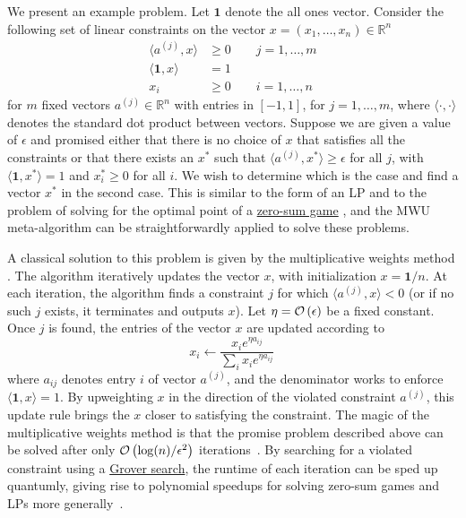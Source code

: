 \begin{refsection}
We present an example problem. Let $\mathbf{1}$ denote the all ones vector. Consider the following set of linear constraints on the vector $x = (x_1,\ldots,x_n) \in \mathbb{R}^n$
\begin{align}
    \langle a^{(j)},x \rangle &\geq 0 \qquad j = 1,\ldots,m\\
    \langle \mathbf{1},x \rangle &= 1 \\
    x_i &\geq 0 \qquad i=1,\ldots,n
\end{align}
for $m$ fixed vectors $a^{(j)} \in \mathbb{R}^n$ with entries in $[-1,1]$, for $j = 1, \ldots, m$, where $\langle \cdot,\cdot \rangle$ denotes the standard dot product between vectors. Suppose we are given a value of $\epsilon$ and promised either that there is no choice of $x$ that satisfies all the constraints or that there exists an $x^*$ such that $\langle a^{(j)}, x^* \rangle \geq \epsilon $ for all $j$, with $\langle \mathbf{1}, x^*\rangle=1$  and $x^*_i \geq 0$ for all $i$. We wish to determine which is the case and find a vector $x^*$ in the second case. This is similar to the form of an LP and to the problem of solving for the optimal point of a \hyperref[appl:ZeroSumGames]{zero-sum game} \cite{arora2012MultiplicativeWeightsAlg,apeldoorn2019QAlgorithmsForZeroSumGames}, and the MWU meta-algorithm can be straightforwardly applied to solve these problems.

A classical solution to this problem is given by the multiplicative weights method \cite{arora2012MultiplicativeWeightsAlg}. The algorithm iteratively updates the vector $x$, with initialization $x = \mathbf{1} / n$. At each iteration, the algorithm finds a constraint $j$ for which $\langle a^{(j)}, x\rangle  < 0$ (or if no such $j$ exists, it terminates and outputs $x$). Let $\eta = \mathcal{O}\left( \epsilon \right)$ be a fixed constant.
Once $j$ is found, the entries of the vector $x$ are updated according to
\begin{equation}\label{eq:MW_update_rule}
    x_i \leftarrow \frac{x_i e^{\eta a_{ij}}}{\sum_i x_i e^{\eta a_{ij}}}\,
\end{equation}
where $a_{ij}$ denotes entry $i$ of vector $a^{(j)}$, and the denominator works to enforce $\langle \mathbf{1}, x \rangle = 1$. By upweighting $x$ in the direction of the violated constraint $a^{(j)}$, this update rule brings the $x$ closer to satisfying the constraint. The magic of the multiplicative weights method is that the promise problem described above can be solved after only $\mathcal{O}\left( \log(n)/\epsilon^2 \right)$ iterations~\cite{arora2012MultiplicativeWeightsAlg}. 
By searching for a violated constraint using a \hyperref[prim:AA]{Grover search}, the runtime of each iteration can be sped up quantumly, giving rise to polynomial speedups for solving zero-sum games and LPs more generally~\cite{apeldoorn2019QAlgorithmsForZeroSumGames}.


\end{refsection}

